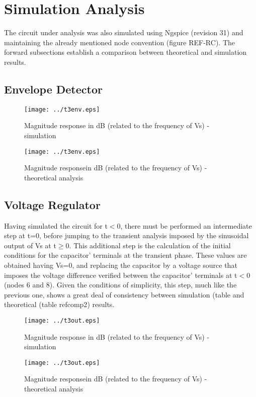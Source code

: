 \section{Simulation Analysis}
\label{sec:simulation}

The circuit under analysis was also simulated using Ngspice (revision 31) and maintaining the already mentioned node convention (figure REF-RC). The forward subsections establish a comparison between theoretical and simulation results.

\subsection{Envelope Detector}




\begin{figure}[h] \centering
  \begin{minipage}{.5\textwidth}
    \texttt{[image: ../t3env.eps]}
    \caption{Magnitude response in dB (related to the frequency of Vs) - simulation}
    \label{fig:simenv}
    \end{minipage}%
  \begin{minipage}{.5\textwidth}
  \centering
    \texttt{[image: ../t3env.eps]}
    \caption{Magnitude responsein dB (related to the frequency of Vs) - theoretical analysis }
    \label{fig:compenv}
      \end{minipage}%
\end{figure}

\subsection{Voltage Regulator}

Having simulated the circuit for t$<$0, there must be performed an intermediate step at t=0, before jumping to the transient analysis imposed by the sinusoidal output of Vs at t$\geq$0. This additional step is the calculation of the initial conditions for the capacitor' terminals at the transient phase. These values are obtained having Vs=0, and replacing the capacitor by a voltage source that imposes the voltage difference verified between the capacitor' terminals at t$<$0 (nodes 6 and 8). Given the conditions of simplicity, this step, much like the previous one, shows a great deal of consistency between simulation (table  and theoretical (table ref{comp2}) results. 




\begin{figure}[h] \centering
  \begin{minipage}{.5\textwidth}
    \texttt{[image: ../t3out.eps]}
    \caption{Magnitude response in dB (related to the frequency of Vs) - simulation}
    \label{fig:simout}
    \end{minipage}%
  \begin{minipage}{.5\textwidth}
  \centering
    \texttt{[image: ../t3out.eps]}
    \caption{Magnitude responsein dB (related to the frequency of Vs) - theoretical analysis }
    \label{fig:compout}
      \end{minipage}%
\end{figure}

